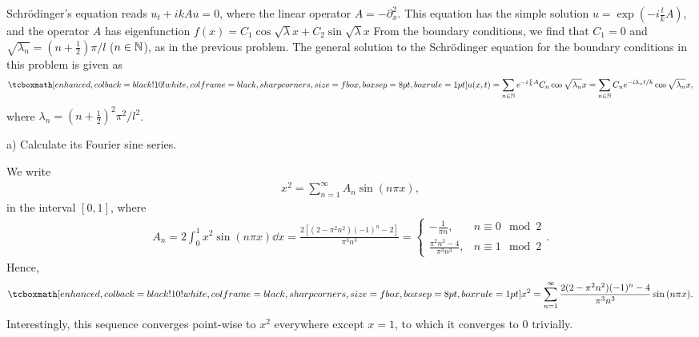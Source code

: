 
Schr\"{o}dinger's equation reads $u_{t} + ikAu = 0$, where the linear operator $A = -\partial^2_{x}$.
This equation has the simple solution $u = \exp(-i\frac{t}{k}A)$, and the operator $A$ has eigenfunction $f(x) = C_{1} \cos{\sqrt{\lambda} x} + C_{2} \sin{\sqrt{\lambda} x}$
From the boundary conditions, we find that $C_{1} = 0$ and $\sqrt{\lambda_{n}} = (n+\frac{1}{2})\pi/l$ ($n \in \mathbb{N}$), as in the previous problem.
The general solution to the Schr\"{o}dinger equation for the boundary conditions in this problem is given as
\begin{eqnarray}
    \label{eq:solution-Schrodinger}
    \eqbox{
    u(x,t) = \sum_{n \in \naturals} e^{-i\frac{t}{k}A} C_{n}\cos{\sqrt{\lambda_{n}}x} = \sum_{n \in \naturals} C_{n} e^{-i\lambda_{n}t/k} \cos{\sqrt{\lambda_{n}} x}
}
,\end{eqnarray}
where $\lambda_{n} = (n+\frac{1}{2})^2\pi^2/l^2$.


a) Calculate its Fourier sine series.

We write
\begin{eqnarray}
    \label{eq:sine-series}
    x^2 = \sum_{n=1}^{\infty} A_{n} \sin{(n\pi x)} 
,\end{eqnarray}
in the interval $[0,1]$, where
\begin{eqnarray}
    \label{eq:coeff-sine}
    A_{n} = 2 \int_{0}^{1} x^2 \sin{(n \pi x)} \dd{x} = \frac{2[(2 - \pi^2n^2)(-1)^{n} - 2]}{\pi^3 n^3} = 
    \begin{cases}
        -\frac{1}{\pi n}, & n \equiv 0 \mod{2} \\
        \frac{\pi^2n^2 - 4}{\pi^3 n^3}, & n \equiv 1 \mod{2}
    \end{cases}
.\end{eqnarray}
Hence,
\begin{align}
    \label{eq:sine-series-with-coeff}
    \eqbox{
    x^2 = \sum_{n=1}^{\infty} \frac{2(2-\pi^2n^2)(-1)^{n} - 4}{\pi^3n^3} \sin{(n\pi x)}
}
.\end{align}
Interestingly, this sequence converges point-wise to $x^2$ everywhere except $x=1$, to which it converges to $0$ trivially.

